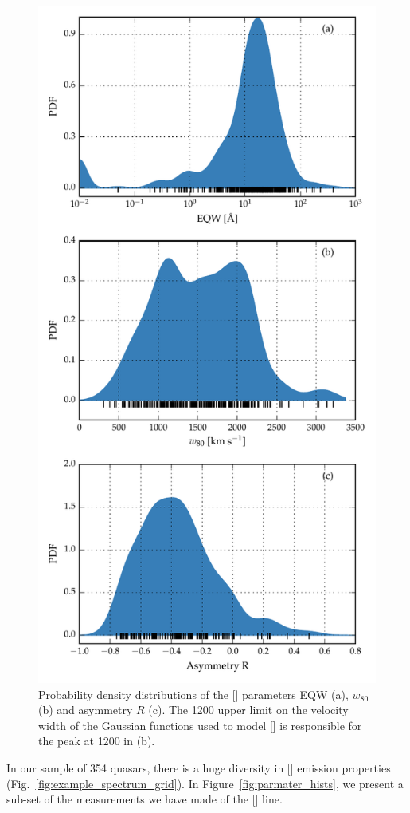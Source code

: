 \begin{figure}
    \centering
    \includegraphics[width=0.8\columnwidth]{figures/chapter04/parameter_hists.pdf} 
    \caption[{Probability density distributions of the [] parameters EQW (a), $w_{80}$ (b) and asymmetry $R$ (c).}]{Probability density distributions of the [] parameters EQW (a), $w_{80}$ (b) and asymmetry $R$ (c). The 1200 \kms upper limit on the velocity width of the Gaussian functions used to model [] is responsible for the peak at 1200 \kms in (b).}     
    \label{fig:parameter_hists}
\end{figure}

In our sample of 354 quasars, there is a huge diversity in [] emission properties (Fig.~\ref{fig:example_spectrum_grid}). 
In Figure~\ref{fig:parmater_hists}, we present a sub-set of the measurements we have made of the [] line.  

